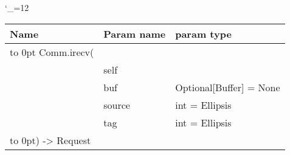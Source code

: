 \begingroup \catcode`\_=12 \tt
\begin{tabular}{lll}
\toprule
\textrm{Name}&\textrm{Param name}&\textrm{param type}\\
\midrule
\hbox to 0pt {Comm.irecv(\hss}\\
& self\\
& buf & Optional[Buffer] = None\\
& source & int = Ellipsis\\
& tag & int = Ellipsis\\
\hbox to 0pt{) -> Request\hss}\\
\bottomrule
\end{tabular}
\endgroup
